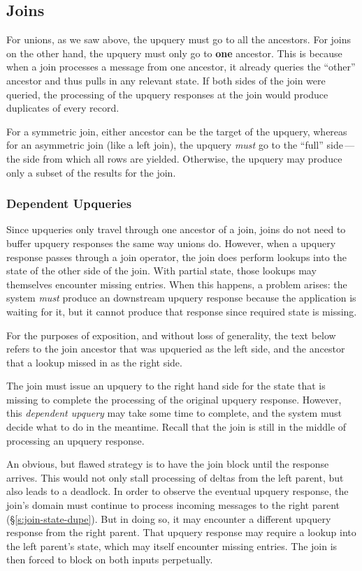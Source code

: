 \subsection{Joins}

For unions, as we saw above, the upquery must go to all the ancestors. For joins
on the other hand, the upquery must only go to \textbf{one} ancestor. This is
because when a join processes a message from one ancestor, it already queries
the ``other'' ancestor and thus pulls in any relevant state. If both sides of
the join were queried, the processing of the upquery responses at the join would
produce duplicates of every record.

For a symmetric join, either ancestor can be the target of the upquery, whereas
for an asymmetric join (like a left join), the upquery \emph{must} go to the
``full'' side\,---\,the side from which all rows are yielded. Otherwise, the
upquery may produce only a subset of the results for the join.

\subsubsection{Dependent Upqueries}

Since upqueries only travel through one ancestor of a join, joins do not need to
buffer upquery responses the same way unions do. However, when a upquery
response passes through a join operator, the join does perform lookups into the
state of the other side of the join. With partial state, those lookups may
themselves encounter missing entries. When this happens, a problem arises: the
system \emph{must} produce an downstream upquery response because the
application is waiting for it, but it cannot produce that response since
required state is missing.

For the purposes of exposition, and without loss of generality, the text below
refers to the join ancestor that was upqueried as the left side, and the
ancestor that a lookup missed in as the right side.

The join must issue an upquery to the right hand side for the state that is
missing to complete the processing of the original upquery response. However,
this \textit{dependent upquery} may take some time to complete, and the system
must decide what to do in the meantime. Recall that the join is still in the
middle of processing an upquery response.

An obvious, but flawed strategy is to have the join block until the response
arrives. This would not only stall processing of deltas from the left parent,
but also leads to a deadlock. In order to observe the eventual upquery response,
the join's domain must continue to process incoming messages to the right parent
(\S\ref{s:join-state-dupe}). But in doing so, it may encounter a different
upquery response from the right parent. That upquery response may require a
lookup into the left parent's state, which may itself encounter missing entries.
The join is then forced to block on both inputs perpetually.

